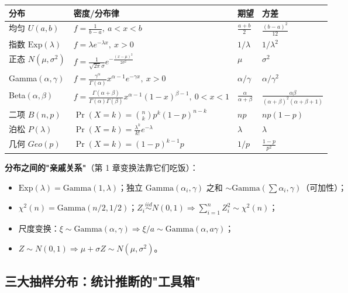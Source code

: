 \begin{center}
\renewcommand{\arraystretch}{1.5}
\begin{tabular}{|l|l|l|l|}
\hline
分布 & 密度/分布律 & 期望 & 方差\\\hline
均匀 $U(a,b)$ & $f=\frac{1}{b-a},\ a<x<b$ & $\frac{a+b}{2}$ & $\frac{(b-a)^2}{12}$\\\hline
指数 $\mathrm{Exp}(\lambda)$ & $f=\lambda e^{-\lambda x},\ x>0$ & $1/\lambda$ & $1/\lambda^2$\\\hline
正态 $N(\mu,\sigma^2)$ & $f=\frac{1}{\sqrt{2\pi}\sigma}e^{-\frac{(x-\mu)^2}{2\sigma^2}}$ & $\mu$ & $\sigma^2$\\\hline
Gamma$(\alpha,\gamma)$ & $f=\frac{\gamma^{\alpha}}{\Gamma(\alpha)}x^{\alpha-1}e^{-\gamma x},\ x>0$ & $\alpha/\gamma$ & $\alpha/\gamma^2$\\\hline
Beta$(\alpha,\beta)$ & $f=\frac{\Gamma(\alpha+\beta)}{\Gamma(\alpha)\Gamma(\beta)}x^{\alpha-1}(1-x)^{\beta-1},\ 0<x<1$ & $\frac{\alpha}{\alpha+\beta}$ & $\frac{\alpha\beta}{(\alpha+\beta)^2(\alpha+\beta+1)}$\\\hline
二项 $B(n,p)$ & $\Pr(X=k)=\binom{n}{k}p^k(1-p)^{n-k}$ & $np$ & $np(1-p)$\\\hline
泊松 $P(\lambda)$ & $\Pr(X=k)=\frac{\lambda^k}{k!}e^{-\lambda}$ & $\lambda$ & $\lambda$\\\hline
几何 $Geo(p)$ & $\Pr(X=k)=(1-p)^{k-1}p$ & $1/p$ & $\frac{1-p}{p^2}$\\\hline
\end{tabular}
\end{center}

\textbf{分布之间的"亲戚关系"}（第 1 章变换法靠它们吃饭）：
\begin{itemize}[leftmargin=2em]
  \item $\mathrm{Exp}(\lambda)=\mathrm{Gamma}(1,\lambda)$；独立 $\mathrm{Gamma}(\alpha_i,\gamma)$ 之和 $\sim\mathrm{Gamma}(\sum\alpha_i,\gamma)$（可加性）；
  \item $\chi^2(n)=\mathrm{Gamma}(n/2,1/2)$；$Z_i\overset{iid}{\sim}N(0,1)\Rightarrow\sum_{i=1}^n Z_i^2\sim\chi^2(n)$；
  \item 尺度变换：$\xi\sim\mathrm{Gamma}(\alpha,\gamma)\Rightarrow\xi/a\sim\mathrm{Gamma}(\alpha,a\gamma)$；
  \item $Z\sim N(0,1)\Rightarrow\mu+\sigma Z\sim N(\mu,\sigma^2)$。
\end{itemize}

\subsection{三大抽样分布：统计推断的"工具箱"}

